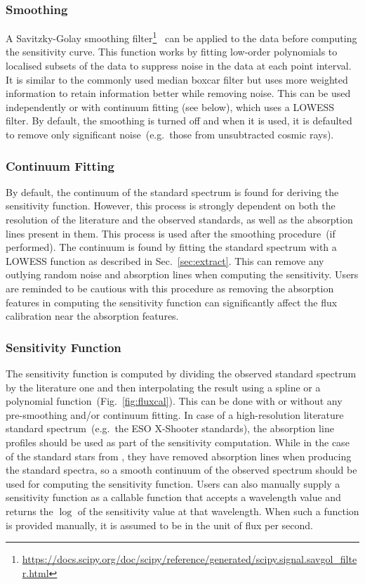 \documentclass[linenumbers, twocolumn]{aastex631}
\begin{document}
\subsubsection*{Smoothing}
A Savitzky-Golay smoothing
filter\footnote{\url{https://docs.scipy.org/doc/scipy/reference/generated/scipy.signal.savgol_filter.html}}~\citep[hereafter, SG-filter]{1964AnaCh..36.1627S}
can be applied to the data before computing the sensitivity curve. This function
works by fitting low-order polynomials to localised subsets of the data to
suppress noise in the data at each point interval. It is similar to the
commonly used median boxcar filter but uses more weighted information to
retain information better while removing noise. This can be used independently
or with continuum fitting (see below), which uses a LOWESS filter. By default,
the smoothing is turned off and when it is used, it is defaulted to
remove only significant noise~(e.g.\ those from unsubtracted cosmic rays).

\subsubsection*{Continuum Fitting}
By default, the continuum of the standard spectrum is found for deriving the
sensitivity function. However, this process is strongly dependent on both the
resolution of the literature and the observed standards, as well as the
absorption lines present in them. This process is used after the smoothing
procedure~(if performed). The continuum is found by fitting the standard
spectrum with a LOWESS function as described in Sec.~\ref{sec:extract}. This
can remove any outlying random noise and absorption lines when computing the 
sensitivity. Users are reminded to be cautious with this procedure as removing
the absorption features in computing the sensitivity function can significantly
affect the flux calibration near the absorption features.

\subsubsection*{Sensitivity Function}
The sensitivity function is computed by dividing the observed standard spectrum
by the literature one and then interpolating the result using a spline or a
polynomial function~(Fig.~\ref{fig:fluxcal}). This can be done with or without
any pre-smoothing and/or continuum fitting. In case of a high-resolution
literature standard spectrum~(e.g.\ the ESO X-Shooter standards), the
absorption line profiles should be used as part of the sensitivity computation.
While in the case of the standard stars from \citet{1990AJ.....99.1621O},
they have removed absorption lines when producing the standard spectra, so a
smooth continuum of the observed spectrum should be used for computing
the sensitivity function. Users can also manually supply a sensitivity function
as a callable function that accepts a wavelength value and returns the $\log$
of the sensitivity value at that wavelength. When such a function is provided
manually, it is assumed to be in the unit of flux per second.
\end{document}
